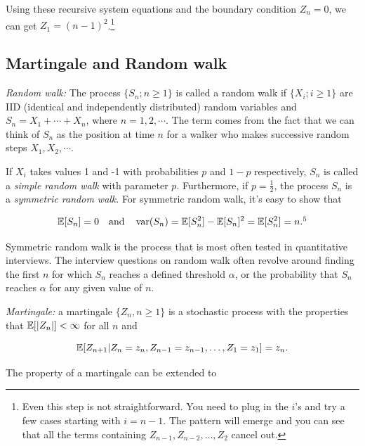 
Using these recursive system equations and the boundary condition $Z_n=0$, we can get
$Z_1=(n-1)^2$.\footnote[4]{Even this step is not straightforward. You need to plug in the
$i$'s and try a few cases starting with $i=n-1$. The pattern will emerge and you can see
that all the terms containing $Z_{n-1},Z_{n-2},\ldots,Z_2$ cancel out.}

\subsection{Martingale and Random walk}

\noindent\emph{Random walk:} The process $\{S_n;n\geq1\}$ is called a random walk if
$\{X_i;i\geq1\}$ are IID (identical and independently distributed) random variables and
$S_n=X_1+\cdots+X_n$, where $n=1,2,\cdots$. The term comes from the fact that we can
think of $S_n$ as the position at time $n$ for a walker who makes successive random
steps $X_1,X_2,\cdots$.

If $X_i$ takes values 1 and -1 with probabilities $p$ and $1-p$ respectively, $S_n$ is
called a \emph{simple random walk} with parameter $p$. Furthermore, if $p=\frac{1}{2}$, the
process $S_n$ is a \emph{symmetric random walk}. For symmetric random walk, it's easy
to show that

\[
\E[S_n]=0\quad\text{and}\quad
\operatorname{var}(S_n)=\E[S_n^2]-\E[S_n]^2=\E[S_n^2]=n.\footnotemark[5]
\]

Symmetric random walk is the process that is most often tested in quantitative interviews.
The interview questions on random walk often revolve around finding the first $n$ for which
$S_n$ reaches a defined threshold $\alpha$, or the probability that $S_n$ reaches
$\alpha$ for any given value of $n$.

\noindent\emph{Martingale:} a martingale $\{Z_n,n\geq1\}$ is a stochastic process with the
properties that $\mathbb{E}[\lvert Z_n\rvert]<\infty$ for all $n$ and

\[
\mathbb{E}[Z_{n+1}\vert Z_n=z_n,Z_{n-1}=z_{n-1},\ldots,Z_1=z_1]=z_n.
\]

The property of a martingale can be extended to

